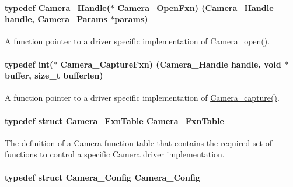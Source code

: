 \paragraph[{Camera\+\_\+\+Open\+Fxn}]{\setlength{\rightskip}{0pt plus 5cm}typedef {\bf Camera\+\_\+\+Handle}($\ast$ Camera\+\_\+\+Open\+Fxn) ({\bf Camera\+\_\+\+Handle} handle, {\bf Camera\+\_\+\+Params} $\ast$params)}\label{_camera_8h_a589bec3690a5b7c7890a0e411a1cad9f}


A function pointer to a driver specific implementation of \hyperlink{_camera_8h_a5bd1f515c97e0f598ff554c663bc6cde}{Camera\+\_\+open()}. 

\paragraph[{Camera\+\_\+\+Capture\+Fxn}]{\setlength{\rightskip}{0pt plus 5cm}typedef int($\ast$ Camera\+\_\+\+Capture\+Fxn) ({\bf Camera\+\_\+\+Handle} handle, void $\ast$buffer, size\+\_\+t bufferlen)}\label{_camera_8h_a2096274266d6a07b48ee25d8f43805a0}


A function pointer to a driver specific implementation of \hyperlink{_camera_8h_a972bd90e219313d8eca55626c4294c8e}{Camera\+\_\+capture()}. 

\paragraph[{Camera\+\_\+\+Fxn\+Table}]{\setlength{\rightskip}{0pt plus 5cm}typedef struct {\bf Camera\+\_\+\+Fxn\+Table}  {\bf Camera\+\_\+\+Fxn\+Table}}\label{_camera_8h_a8c1bd8d1a6d98633dc28a657733d56c8}


The definition of a Camera function table that contains the required set of functions to control a specific Camera driver implementation. 

\paragraph[{Camera\+\_\+\+Config}]{\setlength{\rightskip}{0pt plus 5cm}typedef struct {\bf Camera\+\_\+\+Config}  {\bf Camera\+\_\+\+Config}}\label{_camera_8h_a5dc443a0790d8bd9762dff8cc0716ca0}


